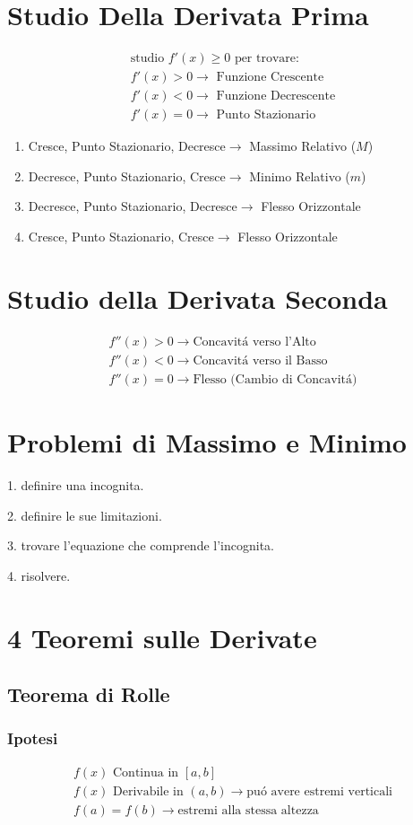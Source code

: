 \documentclass{article}
\begin{document}
\section{Studio Della Derivata Prima}
\begin{gather*}
    \text{studio }f'(x)\geq 0\text{ per trovare:}\\
    f'(x)>0\to \text{ Funzione Crescente}\\
    f'(x)<0\to \text{ Funzione Decrescente}\\
    f'(x)=0\to\text{ Punto Stazionario}
\end{gather*}
\begin{enumerate}
    \item Cresce, Punto Stazionario, Decresce$\to$ Massimo Relativo ($M$)
    \item Decresce, Punto Stazionario, Cresce$\to$ Minimo Relativo ($m$)
    \item Decresce, Punto Stazionario, Decresce$\to$ Flesso Orizzontale
    \item Cresce, Punto Stazionario, Cresce$\to$ Flesso Orizzontale
\end{enumerate}
\section{Studio della Derivata Seconda}
\begin{gather*}
    f''(x)>0\to\text{Concavitá verso l'Alto}\\
    f''(x)<0\to\text{Concavitá verso il Basso}\\
    f''(x)=0\to\text{Flesso (Cambio di Concavitá)}
\end{gather*}
\section{Problemi di Massimo e Minimo}
1. definire una incognita.

2. definire le sue limitazioni.

3. trovare l'equazione che comprende l'incognita.

4. risolvere.
\section{4 Teoremi sulle Derivate}
\subsection{Teorema di Rolle}
\subsubsection{Ipotesi}
\begin{gather*}
    f(x)\text{ Continua in }[a,b]\\
    f(x)\text{ Derivabile in }(a,b)\to\text{puó avere estremi verticali}\\
    f(a) = f(b)\to\text{estremi alla stessa altezza}
\end{gather*}
\end{document}
